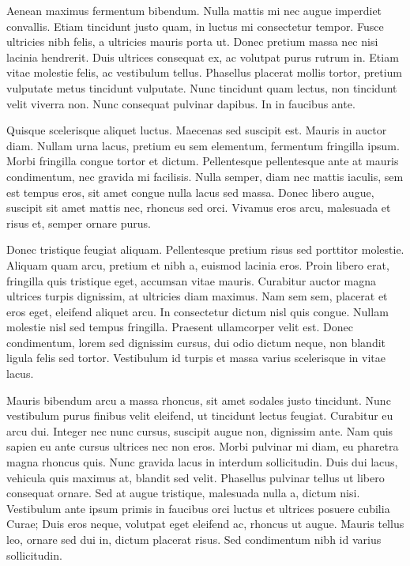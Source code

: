 \documentclass[a4paper,10pt,twoside]{article} %
\begin{document}
Aenean maximus fermentum bibendum.
Nulla mattis mi nec augue imperdiet convallis.
Etiam tincidunt justo quam, in luctus mi consectetur tempor.
Fusce ultricies nibh felis, a ultricies mauris porta ut.
Donec pretium massa nec nisi lacinia hendrerit.
Duis ultrices consequat ex, ac volutpat purus rutrum in.
Etiam vitae molestie felis, ac vestibulum tellus.
Phasellus placerat mollis tortor, pretium vulputate metus tincidunt vulputate.
Nunc tincidunt quam lectus, non tincidunt velit viverra non.
Nunc consequat pulvinar dapibus.
In in faucibus ante.

Quisque scelerisque aliquet luctus.
Maecenas sed suscipit est.
Mauris in auctor diam.
Nullam urna lacus, pretium eu sem elementum, fermentum fringilla ipsum.
Morbi fringilla congue tortor et dictum.
Pellentesque pellentesque ante at mauris condimentum, nec gravida mi facilisis.
Nulla semper, diam nec mattis iaculis, sem est tempus eros, sit amet congue nulla lacus sed massa.
Donec libero augue, suscipit sit amet mattis nec, rhoncus sed orci.
Vivamus eros arcu, malesuada et risus et, semper ornare purus.

Donec tristique feugiat aliquam.
Pellentesque pretium risus sed porttitor molestie.
Aliquam quam arcu, pretium et nibh a, euismod lacinia eros.
Proin libero erat, fringilla quis tristique eget, accumsan vitae mauris.
Curabitur auctor magna ultrices turpis dignissim, at ultricies diam maximus.
Nam sem sem, placerat et eros eget, eleifend aliquet arcu.
In consectetur dictum nisl quis congue.
Nullam molestie nisl sed tempus fringilla.
Praesent ullamcorper velit est.
Donec condimentum, lorem sed dignissim cursus, dui odio dictum neque, non blandit ligula felis sed tortor.
Vestibulum id turpis et massa varius scelerisque in vitae lacus.

Mauris bibendum arcu a massa rhoncus, sit amet sodales justo tincidunt.
Nunc vestibulum purus finibus velit eleifend, ut tincidunt lectus feugiat.
Curabitur eu arcu dui.
Integer nec nunc cursus, suscipit augue non, dignissim ante.
Nam quis sapien eu ante cursus ultrices nec non eros.
Morbi pulvinar mi diam, eu pharetra magna rhoncus quis.
Nunc gravida lacus in interdum sollicitudin.
Duis dui lacus, vehicula quis maximus at, blandit sed velit.
Phasellus pulvinar tellus ut libero consequat ornare.
Sed at augue tristique, malesuada nulla a, dictum nisi.
Vestibulum ante ipsum primis in faucibus orci luctus et ultrices posuere cubilia Curae; Duis eros neque, volutpat eget eleifend ac, rhoncus ut augue.
Mauris tellus leo, ornare sed dui in, dictum placerat risus.
Sed condimentum nibh id varius sollicitudin.
\end{document}

